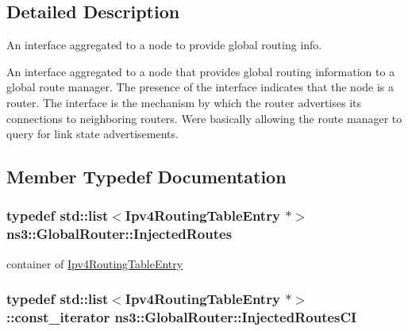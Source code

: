 \subsection{Detailed Description}
An interface aggregated to a node to provide global routing info. 

An interface aggregated to a node that provides global routing information to a global route manager. The presence of the interface indicates that the node is a router. The interface is the mechanism by which the router advertises its connections to neighboring routers. We\textquotesingle{}re basically allowing the route manager to query for link state advertisements. 

\subsection{Member Typedef Documentation}
\subsubsection[{\texorpdfstring{Injected\+Routes}{InjectedRoutes}}]{\setlength{\rightskip}{0pt plus 5cm}typedef {\bf std\+::list}$<${\bf Ipv4\+Routing\+Table\+Entry} $\ast$$>$ {\bf ns3\+::\+Global\+Router\+::\+Injected\+Routes}\hspace{0.3cm}{\ttfamily [private]}}\hypertarget{classns3_1_1GlobalRouter_a26119d19a18a0c540baffdc16f0a731f}{}\label{classns3_1_1GlobalRouter_a26119d19a18a0c540baffdc16f0a731f}


container of \hyperlink{classns3_1_1Ipv4RoutingTableEntry}{Ipv4\+Routing\+Table\+Entry} 

\subsubsection[{\texorpdfstring{Injected\+Routes\+CI}{InjectedRoutesCI}}]{\setlength{\rightskip}{0pt plus 5cm}typedef {\bf std\+::list}$<${\bf Ipv4\+Routing\+Table\+Entry} $\ast$$>$\+::const\+\_\+iterator {\bf ns3\+::\+Global\+Router\+::\+Injected\+Routes\+CI}\hspace{0.3cm}{\ttfamily [private]}}\hypertarget{classns3_1_1GlobalRouter_aea87fa6405b7c0e2bd56adfcf37823a8}{}\label{classns3_1_1GlobalRouter_aea87fa6405b7c0e2bd56adfcf37823a8}



